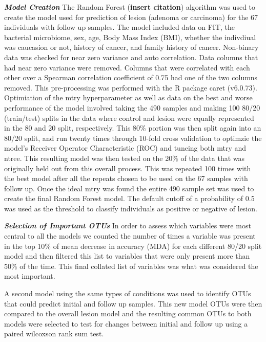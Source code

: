 \documentclass[12pt,]{article}
\begin{document}
\textbf{\emph{Model Creation}} The Random Forest (\textbf{insert
citation}) algorithm was used to create the model used for prediction of
lesion (adenoma or carcinoma) for the 67 individuals with follow up
samples. The model included data on FIT, the bacterial microbiome, sex,
age, Body Mass Index (BMI), whether the indivdiual was caucasion or not,
history of cancer, and family history of cancer. Non-binary data was
checked for near zero variance and auto correlation. Data columns that
had near zero variance were removed. Columns that were correlated with
each other over a Spearman correlation coefficient of 0.75 had one of
the two columns removed. This pre-processing was performed with the R
package caret (v6.0.73). Optimiation of the mtry hyperparameter as well
as data on the best and worse performance of the model involved taking
the 490 samples and making 100 80/20 (train/test) splits in the data
where control and lesion were equally represented in the 80 and 20
split, respectively. This 80\% portion was then split again into an
80/20 split, and run twenty times through 10-fold cross validation to
optimzie the model's Receiver Operator Characteristic (ROC) and tuneing
both mtry and ntree. This resulting model was then tested on the 20\% of
the data that was originally held out from this overall process. This
was repeated 100 times with the best model after all the repeats chosen
to be used on the 67 samples with follow up. Once the ideal mtry was
found the entire 490 sample set was used to create the final Random
Forest model. The default cutoff of a probability of 0.5 was used as the
threshold to classify individuals as positive or negative of lesion.

\textbf{\emph{Selection of Important OTUs}} In order to assess which
variables were most central to all the models we counted the number of
times a variable was present in the top 10\% of mean decrease in
accuracy (MDA) for each different 80/20 split model and then filtered
this list to variables that were only present more than 50\% of the
time. This final collated list of variables was what was considered the
most important.

A second model using the same types of conditions was used to identify
OTUs that could predict initial and follow up samples. This new model
OTUs were then compared to the overall lesion model and the resulting
common OTUs to both models were selected to test for changes between
initial and follow up using a paired wilcoxson rank sum test.
\end{document}

